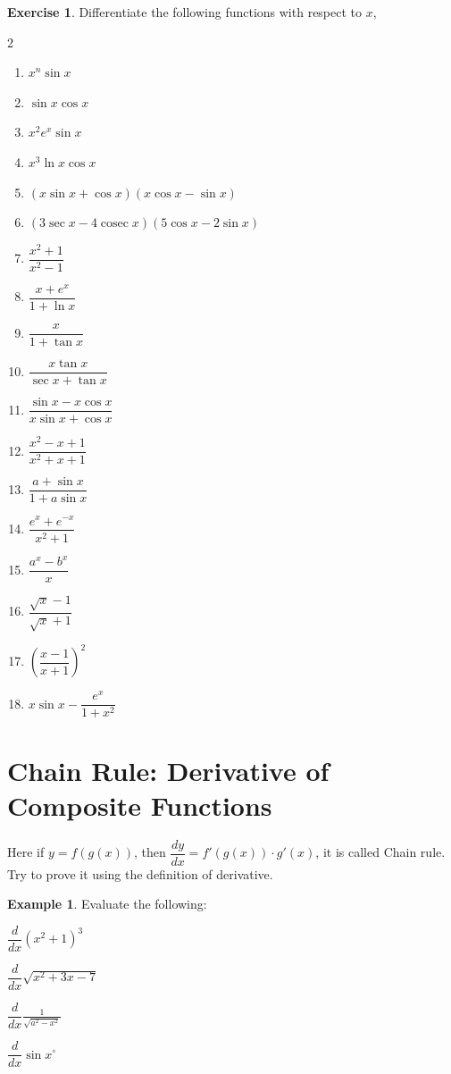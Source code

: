 \documentclass[../../main.tex]{subfiles}
\DeclareMathOperator{\cosec}{cosec}
\theoremstyle{definition}
\newtheorem{exercise}{Exercise}[section]
\newtheorem{example}{Example}[section]
\begin{document}
\begin{exercise}
Differentiate the following functions with respect to $x$,
\begin{multicols}{2}
\begin{enumerate}[label=(\roman*)]
    \item $x^n\sin x$
    \item $\sin x \cos x$
    \item $x^2e^x\sin x$   
    \item $x^3\ln x \cos x$
    \item $(x\sin x+\cos x)(x\cos x-\sin x)$
    \item $(3\sec x-4\cosec x)(5\cos x-2\sin x)$
    \item $\dfrac{x^2+1}{x^2-1}$
    \item $\dfrac{x+e^x}{1+\ln x}$
    \item $\dfrac{x}{1+ \tan x}$
    \item $\dfrac{x\tan x}{\sec x+\tan x}$
    \item $\dfrac{\sin x-x\cos x}{x\sin x+\cos x}$
    \item $\dfrac{x^2-x+1}{x^2+x+1}$
    \item $\dfrac{a+\sin x}{1+a\sin x}$
    \item$\dfrac{e^x+e^{-x}}{x^2+1}$
    \item $\dfrac{a^x-b^x}{x}$
    \item $\dfrac{\sqrt{x}-1}{\sqrt{x}+1}$
    \item $(\dfrac{x-1}{x+1})^2$
    \item $x\sin x-\dfrac{e^x}{1+x^2}$
\end{enumerate}
\end{multicols}
\end{exercise}




\section{Chain Rule: Derivative of Composite Functions}


Here if $y=f(g(x))$, then $\dfrac{dy}{dx}=f'(g(x))\cdot g'(x)$, it is called Chain rule. Try to prove it using the definition of derivative.

\begin{example}
Evaluate the following: \begin{enumerate*}[label=(\roman*)]
    \item $\dfrac{d}{dx} (x^2+1)^3$
    \item $\dfrac{d}{dx} \sqrt{x^2+3x-7}$
    \item $\dfrac{d}{dx} \frac{1}{\sqrt{a^2-x^2}}$
    \item $\dfrac{d}{dx}\sin x^\circ$
\end{enumerate*}
\end{example}
\end{document}
